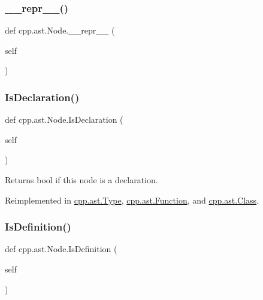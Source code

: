\subsubsection{\texorpdfstring{\_\_repr\_\_()}{\_\_repr\_\_()}}
{\footnotesize\ttfamily def cpp.\+ast.\+Node.\+\_\+\+\_\+repr\+\_\+\+\_\+ (\begin{DoxyParamCaption}\item[{}]{self }\end{DoxyParamCaption})}

\mbox{\label{classcpp_1_1ast_1_1Node_ab3eca703a79fb65bc25dfbcb7547c79e}} 
\subsubsection{\texorpdfstring{IsDeclaration()}{IsDeclaration()}}
{\footnotesize\ttfamily def cpp.\+ast.\+Node.\+Is\+Declaration (\begin{DoxyParamCaption}\item[{}]{self }\end{DoxyParamCaption})}

\begin{DoxyVerb}Returns bool if this node is a declaration.\end{DoxyVerb}
 

Reimplemented in \mbox{\hyperlink{classcpp_1_1ast_1_1Type_a590071a2bce7ea5140d7eb86c90f63bf}{cpp.\+ast.\+Type}}, \mbox{\hyperlink{classcpp_1_1ast_1_1Function_ab9120d9a774eb5860d220b3bcdcaa87e}{cpp.\+ast.\+Function}}, and \mbox{\hyperlink{classcpp_1_1ast_1_1Class_a4758bfb7c00410575932974e1ed8b7da}{cpp.\+ast.\+Class}}.

\mbox{\label{classcpp_1_1ast_1_1Node_a684ee9a357168e7e07a24fc6812f66e6}} 
\subsubsection{\texorpdfstring{IsDefinition()}{IsDefinition()}}
{\footnotesize\ttfamily def cpp.\+ast.\+Node.\+Is\+Definition (\begin{DoxyParamCaption}\item[{}]{self }\end{DoxyParamCaption})}

